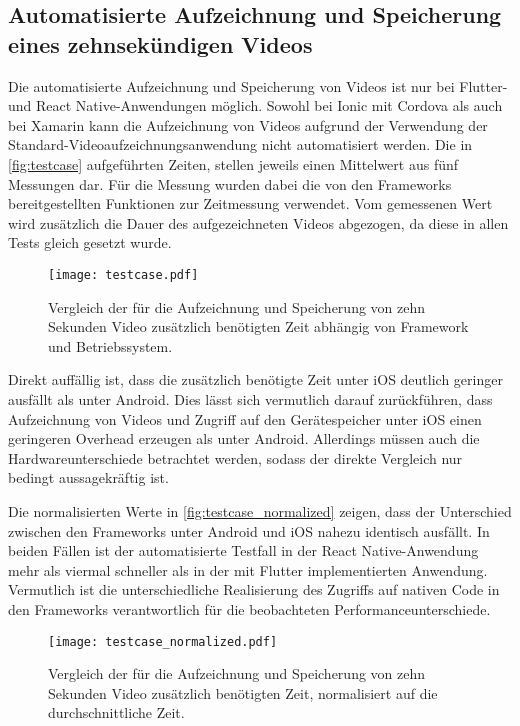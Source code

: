 \subsection{Automatisierte Aufzeichnung und Speicherung eines zehnsekündigen Videos}

Die automatisierte Aufzeichnung und Speicherung von Videos ist nur bei Flutter- und React Native-Anwendungen möglich.
Sowohl bei Ionic mit Cordova als auch bei Xamarin kann die Aufzeichnung von Videos aufgrund der Verwendung der Standard-Videoaufzeichnungsanwendung nicht automatisiert werden.
Die in \autoref{fig:testcase} aufgeführten Zeiten, stellen jeweils einen Mittelwert aus fünf Messungen dar.
Für die Messung wurden dabei die von den Frameworks bereitgestellten Funktionen zur Zeitmessung verwendet.
Vom gemessenen Wert wird zusätzlich die Dauer des aufgezeichneten Videos abgezogen, da diese in allen Tests gleich gesetzt wurde.

\begin{figure}[ht]
  \centering 
  \texttt{[image: testcase.pdf]}
  \caption{Vergleich der für die Aufzeichnung und Speicherung von zehn Sekunden Video zusätzlich benötigten Zeit abhängig von Framework und Betriebssystem.}
  \label{fig:testcase}
\end{figure}

Direkt auffällig ist, dass die zusätzlich benötigte Zeit unter iOS deutlich geringer ausfällt als unter Android.
Dies lässt sich vermutlich darauf zurückführen, dass Aufzeichnung von Videos und Zugriff auf den Gerätespeicher unter iOS einen geringeren Overhead erzeugen als unter Android.
Allerdings müssen auch die Hardwareunterschiede betrachtet werden, sodass der direkte Vergleich nur bedingt aussagekräftig ist.

Die normalisierten Werte in \autoref{fig:testcase_normalized} zeigen, dass der Unterschied zwischen den Frameworks unter Android und iOS nahezu identisch ausfällt.
In beiden Fällen ist der automatisierte Testfall in der React Native-Anwendung mehr als viermal schneller als in der mit Flutter implementierten Anwendung.
Vermutlich ist die unterschiedliche Realisierung des Zugriffs auf nativen Code in den Frameworks verantwortlich für die beobachteten Performanceunterschiede.
\begin{figure}[ht]
  \centering 
  \texttt{[image: testcase\_normalized.pdf]}
  \caption{Vergleich der für die Aufzeichnung und Speicherung von zehn Sekunden Video zusätzlich benötigten Zeit, normalisiert auf die durchschnittliche Zeit.}
  \label{fig:testcase_normalized}
\end{figure}

